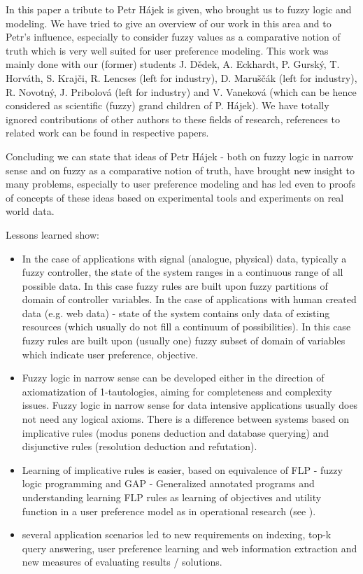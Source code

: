 In this paper a tribute to Petr H\'{a}jek is given, who brought us to fuzzy logic and modeling. We have tried to give an overview of our work in this area and to Petr's influence, especially to consider fuzzy values as a comparative notion of truth which is very well suited for user preference modeling. This work was mainly done with our (former) students J. D\v{e}dek, A. Eckhardt, P. Gursk\'{y}, T. Horv\'{a}th, S. Kraj\v{c}i, R. Lencses (left for industry), D. Maru\v{s}\v{c}{\'a}k (left for industry), R. Novotn\'{y}, J. Pribolov{\'{a}} (left for industry) and V. Vanekov{\'{a}} (which can be hence considered as scientific (fuzzy) grand children of P. H\'{a}jek). We have totally ignored contributions of other authors to these fields of research, references to related work can be found in respective papers. 

     Concluding we can state that ideas of Petr H\'{a}jek - both on fuzzy logic in narrow sense and on fuzzy as a comparative notion of truth, have brought new insight to many problems, especially to user preference modeling and has led  even to proofs of concepts of these ideas based on experimental tools and experiments on real world data.
     
          Lessons learned show:

\begin{itemize}
	\item In the case of applications with signal (analogue, physical) data, typically a fuzzy controller, the state of the system ranges in a continuous range of all possible data. In this case fuzzy rules are built upon fuzzy partitions of domain of controller variables. In the case of applications with human created data (e.g. web data) - state of the system contains only data of existing resources (which usually do not fill a continuum of possibilities). In this case fuzzy rules are built upon (usually one) fuzzy subset of domain of variables which indicate user preference, objective.

	\item Fuzzy logic in narrow sense can be developed either in the direction of axiomatization of 1-tautologies, aiming for completeness and complexity issues. Fuzzy logic in narrow sense for data intensive applications usually does not need any logical axioms. There is a difference between systems based on implicative rules (modus ponens deduction and database querying) and disjunctive rules (resolution deduction and refutation). 

	\item Learning of implicative rules is easier, based on equivalence of FLP - fuzzy logic programming and GAP - Generalized annotated programs  and understanding learning FLP rules as learning of objectives and utility function in a user preference model as in operational research (see \cite{47}). 

	\item several application scenarios led to new requirements on indexing, top-k query answering, user preference learning and web information extraction and new measures of evaluating results / solutions. 
\end{itemize}

